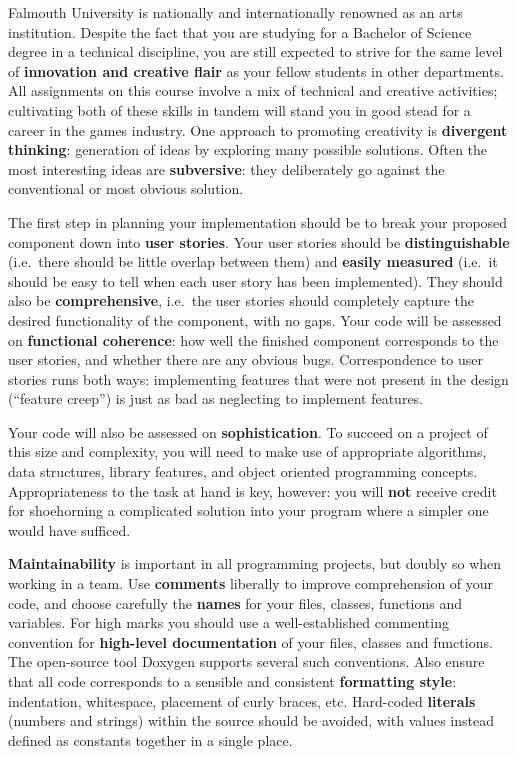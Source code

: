 \documentclass{../fal_assignment}
\begin{document}
Falmouth University is nationally and internationally renowned as an arts institution.
Despite the fact that you are studying for a Bachelor of Science degree in a technical discipline,
you are still expected to strive for the same level of \textbf{innovation and creative flair}
as your fellow students in other departments.
All assignments on this course involve a mix of technical and creative activities;
cultivating both of these skills in tandem will stand you in good stead for a career in the games industry.
One approach to promoting creativity is
\textbf{divergent thinking}: generation of ideas by exploring many possible solutions.
Often the most interesting ideas are \textbf{subversive}: they deliberately go against the
conventional or most obvious solution.

The first step in planning your implementation should be to break your proposed component down into \textbf{user stories}. 
Your user stories should be \textbf{distinguishable} (i.e.\ there should be little overlap between them)
and \textbf{easily measured} (i.e.\ it should be easy to tell when each user story has been implemented).
They should also be \textbf{comprehensive}, i.e.\ the user stories should completely capture the
desired functionality of the component, with no gaps.
Your code will be assessed on \textbf{functional coherence}:
how well the finished component corresponds to the user stories,
and whether there are any obvious bugs.
Correspondence to user stories runs both ways:
implementing features that were not present in the design (``feature creep'')
is just as bad as neglecting to implement features.

Your code will also be assessed on \textbf{sophistication}.
To succeed on a project of this size and complexity,
you will need to make use of appropriate algorithms, data structures, library features, and object oriented programming concepts.
Appropriateness to the task at hand is key, however:
you will \textbf{not} receive credit for shoehorning a complicated solution into your program
where a simpler one would have sufficed.

\textbf{Maintainability} is important in all programming projects,
but doubly so when working in a team.
Use \textbf{comments} liberally to improve comprehension of your code,
and choose carefully the \textbf{names} for your files, classes, functions and variables.
For high marks you should use a well-established commenting convention
for \textbf{high-level documentation} of your files, classes and functions.
The open-source tool Doxygen supports several such conventions.
Also ensure that all code corresponds to a sensible and consistent \textbf{formatting style}:
indentation, whitespace, placement of curly braces, etc.
Hard-coded \textbf{literals} (numbers and strings) within the source should be avoided,
with values instead defined as constants together in a single place.
\end{document}
